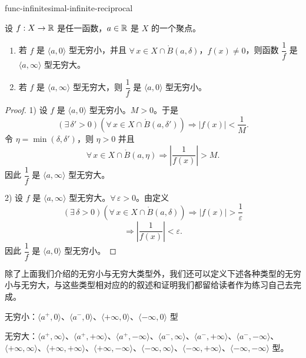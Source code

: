 \begin{mythm}{}{func-infinitesimal-infinite-reciprocal}

	设 \(f:X\to\mathbb{R}\) 是任一函数，\(a\in\mathbb{R}\) 是 \(X\) 的一个聚点。

	\begin{enumerate}[label=\arabic*)]
		\item 若 \(f\) 是 \(\langle a,0\rangle\) 型无穷小，并且 \(\forall\,x\in X\cap\mathring{B}(a,\delta)\)，\(f(x)\neq0\)，则函数 \(\dfrac1f\) 是 \(\langle a,\infty\rangle\) 型无穷大。

		\item 若 \(f\) 是 \(\langle a,\infty\rangle\) 型无穷大，则 \(\dfrac1f\) 是 \(\langle a,0\rangle\) 型无穷小。
	\end{enumerate}

\end{mythm}

\begin{proof}

	1) 设 \(f\) 是 \(\langle a,0\rangle\) 型无穷小。\(M>0\)。于是
	\[
	(\exists\,\delta'>0)(\forall\,x\in X\cap\mathring{B}(a,\delta'))\Longrightarrow |f(x)|<\frac1M.
	\]
	令 \(\eta=\min(\delta,\delta')\)，则 \(\eta>0\) 并且
	\[
	\forall\,x\in X\cap\mathring{B}(a,\eta)\Longrightarrow \left|\frac1{f(x)}\right|>M.
	\]
	因此 \(\dfrac1f\) 是 \(\langle a,\infty\rangle\) 型无穷大。

	2) 设 \(f\) 是 \(\langle a,\infty\rangle\) 型无穷大。\(\forall\,\varepsilon>0\)。由定义
	\[
	(\exists\,\delta>0)(\forall\,x\in X\cap\mathring{B}(a,\delta))\Longrightarrow |f(x)|>\frac1\varepsilon
	\]
	\[
	\Longrightarrow \left|\frac1{f(x)}\right|<\varepsilon.
	\]
	因此 \(\dfrac1f\) 是 \(\langle a,0\rangle\) 型无穷小。

\end{proof}

除了上面我们介绍的无穷小与无穷大类型外，我们还可以定义下述各种类型的无穷小与无穷大，与这些类型相对应的的叙述和证明我们都留给读者作为练习自己去完成。

无穷小：\(\langle a^+,0\rangle\)、\(\langle a^-,0\rangle\)、\(\langle+\infty,0\rangle\)、\(\langle-\infty,0\rangle\) 型

无穷大：\(\langle a^+,\infty\rangle\)、\(\langle a^+,+\infty\rangle\)、\(\langle a^+,-\infty\rangle\)、\(\langle a^-,\infty\rangle\)、\(\langle a^-,+\infty\rangle\)、\(\langle a^-,-\infty\rangle\)、\(\langle+\infty,\infty\rangle\)、\(\langle+\infty,+\infty\rangle\)、\(\langle+\infty,-\infty\rangle\)、\(\langle-\infty,\infty\rangle\)、\(\langle-\infty,+\infty\rangle\)、\(\langle-\infty,-\infty\rangle\) 型。

